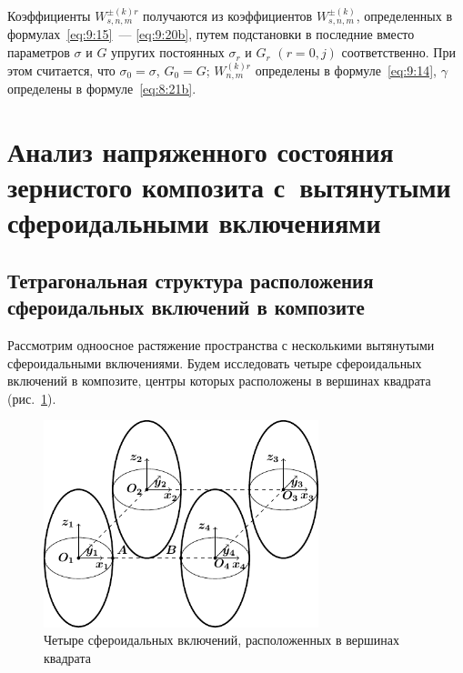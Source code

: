 Коэффициенты $W_{s,n,m}^{ \pm (k)r}$ получаются из коэффициентов $W_{s,n,m}^{ \pm (k)}$, определенных в формулах~\eqref{eq:9:15}~--- \eqref{eq:9:20b}, путем подстановки в последние вместо параметров $\sigma$ и $G$ упругих постоянных $\sigma_r$ и $G_r$ $(r=0,j)$ соответственно. При этом считается, что $\sigma_0=\sigma$, $G_0=G$; $W_{n,m}^{(k)r}$ определены в формуле~\eqref{eq:9:14}, $\gamma$ определены в формуле~\eqref{eq:8:21b}.

\section{Анализ напряженного состояния зернистого композита с~вытянутыми сфероидальными включениями}

\subsection{Тетрагональная структура расположения сфероидальных включений в композите}

Рассмотрим одноосное растяжение пространства с несколькими вытянутыми сфероидальными включениями. Будем исследовать четыре сфероидальных включений в композите, центры которых расположены в вершинах квадрата (рис.~\ref{f:9:66}).

\begin{figure}[h!]
\centering
\includegraphics[width=8cm]{cartesian-spheroids-4.pdf}
\caption{Четыре сфероидальных включений, расположенных в вершинах квадрата}
\label{f:9:66}
\end{figure}


